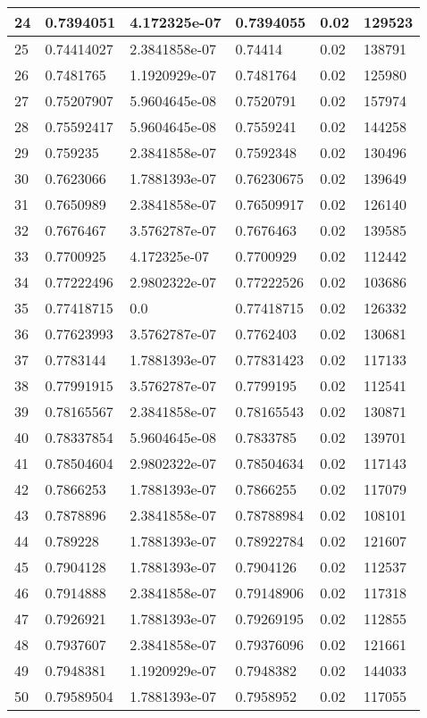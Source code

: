\begin{longtable}{|l|l|l|l|l|l|}
24 & 0.7394051 & 4.172325e-07 & 0.7394055 & 0.02 & 129523 \\ \hline 
25 & 0.74414027 & 2.3841858e-07 & 0.74414 & 0.02 & 138791 \\ \hline 
26 & 0.7481765 & 1.1920929e-07 & 0.7481764 & 0.02 & 125980 \\ \hline 
27 & 0.75207907 & 5.9604645e-08 & 0.7520791 & 0.02 & 157974 \\ \hline 
28 & 0.75592417 & 5.9604645e-08 & 0.7559241 & 0.02 & 144258 \\ \hline 
29 & 0.759235 & 2.3841858e-07 & 0.7592348 & 0.02 & 130496 \\ \hline 
30 & 0.7623066 & 1.7881393e-07 & 0.76230675 & 0.02 & 139649 \\ \hline 
31 & 0.7650989 & 2.3841858e-07 & 0.76509917 & 0.02 & 126140 \\ \hline 
32 & 0.7676467 & 3.5762787e-07 & 0.7676463 & 0.02 & 139585 \\ \hline 
33 & 0.7700925 & 4.172325e-07 & 0.7700929 & 0.02 & 112442 \\ \hline 
34 & 0.77222496 & 2.9802322e-07 & 0.77222526 & 0.02 & 103686 \\ \hline 
35 & 0.77418715 & 0.0 & 0.77418715 & 0.02 & 126332 \\ \hline 
36 & 0.77623993 & 3.5762787e-07 & 0.7762403 & 0.02 & 130681 \\ \hline 
37 & 0.7783144 & 1.7881393e-07 & 0.77831423 & 0.02 & 117133 \\ \hline 
38 & 0.77991915 & 3.5762787e-07 & 0.7799195 & 0.02 & 112541 \\ \hline 
39 & 0.78165567 & 2.3841858e-07 & 0.78165543 & 0.02 & 130871 \\ \hline 
40 & 0.78337854 & 5.9604645e-08 & 0.7833785 & 0.02 & 139701 \\ \hline 
41 & 0.78504604 & 2.9802322e-07 & 0.78504634 & 0.02 & 117143 \\ \hline 
42 & 0.7866253 & 1.7881393e-07 & 0.7866255 & 0.02 & 117079 \\ \hline 
43 & 0.7878896 & 2.3841858e-07 & 0.78788984 & 0.02 & 108101 \\ \hline 
44 & 0.789228 & 1.7881393e-07 & 0.78922784 & 0.02 & 121607 \\ \hline 
45 & 0.7904128 & 1.7881393e-07 & 0.7904126 & 0.02 & 112537 \\ \hline 
46 & 0.7914888 & 2.3841858e-07 & 0.79148906 & 0.02 & 117318 \\ \hline 
47 & 0.7926921 & 1.7881393e-07 & 0.79269195 & 0.02 & 112855 \\ \hline 
48 & 0.7937607 & 2.3841858e-07 & 0.79376096 & 0.02 & 121661 \\ \hline 
49 & 0.7948381 & 1.1920929e-07 & 0.7948382 & 0.02 & 144033 \\ \hline 
50 & 0.79589504 & 1.7881393e-07 & 0.7958952 & 0.02 & 117055 \\ \hline 
\end{longtable}